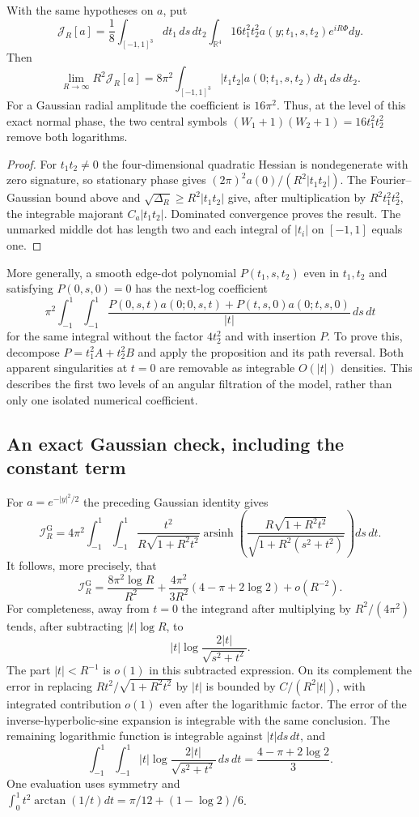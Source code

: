 \begin{corollary}
With the same hypotheses on $a$, put
\[
 \mathcal J_R[a]=\frac18\int_{[-1,1]^3}dt_1\,ds\,dt_2
       \int_{\mathbb R^4}16t_1^2t_2^2a(y;t_1,s,t_2)e^{iR\Phi}dy.
\]
Then
\[
 \lim_{R\to\infty}R^2\mathcal J_R[a]
 =8\pi^2\int_{[-1,1]^3}|t_1t_2|
                       a(0;t_1,s,t_2)dt_1\,ds\,dt_2.
\]
For a Gaussian radial amplitude the coefficient is $16\pi^2$.
Thus, at the level of this exact normal phase, the two central symbols
$(W_1+1)(W_2+1)=16t_1^2t_2^2$ remove both logarithms.
\end{corollary}

\begin{proof}
For $t_1t_2\ne0$ the four-dimensional quadratic Hessian is
nondegenerate with zero signature, so stationary phase gives
$(2\pi)^2a(0)/(R^2|t_1t_2|)$.
The Fourier--Gaussian bound above and
$\sqrt{\Delta_R}\geq R^2|t_1t_2|$ give, after multiplication by
$R^2t_1^2t_2^2$, the integrable majorant $C_a|t_1t_2|$.
Dominated convergence proves the result.  The unmarked middle dot
has length two and each integral of $|t_i|$ on $[-1,1]$ equals one.
\end{proof}

More generally, a smooth edge-dot polynomial $P(t_1,s,t_2)$ even
in $t_1,t_2$ and satisfying $P(0,s,0)=0$ has the next-log coefficient
\[
 \pi^2\int_{-1}^1\!\int_{-1}^1\frac{
 P(0,s,t)a(0;0,s,t)+P(t,s,0)a(0;t,s,0)}{|t|}\,ds\,dt
\]
for the same integral without the factor $4t_2^2$ and with insertion
$P$.  To prove this, decompose $P=t_1^2A+t_2^2B$ and apply the
proposition and its path reversal.  Both apparent singularities at
$t=0$ are removable as integrable $O(|t|)$ densities.  This describes
the first two levels of an angular filtration of the model, rather
than only one isolated numerical coefficient.

\subsection{An exact Gaussian check, including the constant term}
For $a=e^{-|y|^2/2}$ the preceding Gaussian identity gives
\[
 \mathcal I_R^{\mathrm G}
 =4\pi^2\int_{-1}^1\!\int_{-1}^1
 \frac{t^2}{R\sqrt{1+R^2t^2}}
 \operatorname{arsinh}\!\left(
 \frac{R\sqrt{1+R^2t^2}}{\sqrt{1+R^2(s^2+t^2)}}\right)ds\,dt.
\]
It follows, more precisely, that
\[
 \boxed{\quad
 \mathcal I_R^{\mathrm G}
 =\frac{8\pi^2\log R}{R^2}
 +\frac{4\pi^2}{3R^2}(4-\pi+2\log2)+o(R^{-2}).\quad}
\]
For completeness, away from $t=0$ the integrand after multiplying by
$R^2/(4\pi^2)$ tends, after subtracting $|t|\log R$, to
\[
 |t|\log\frac{2|t|}{\sqrt{s^2+t^2}}.
\]
The part $|t|<R^{-1}$ is $o(1)$ in this subtracted expression.
On its complement the error in replacing
$Rt^2/\sqrt{1+R^2t^2}$ by $|t|$ is bounded by
$C/(R^2|t|)$, with integrated contribution $o(1)$ even after the
logarithmic factor.  The error of the inverse-hyperbolic-sine
expansion is integrable with the same conclusion.  The remaining
logarithmic function is integrable against $|t|ds\,dt$, and
\[
 \int_{-1}^1\!\int_{-1}^1
 |t|\log\frac{2|t|}{\sqrt{s^2+t^2}}\,ds\,dt
       =\frac{4-\pi+2\log2}{3}.
\]
One evaluation uses symmetry and
$\int_0^1 t^2\arctan(1/t)dt=\pi/12+(1-\log2)/6$.

